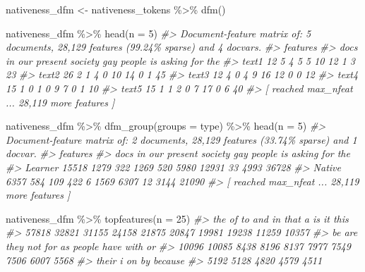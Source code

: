 \documentclass[
]{article}
\newenvironment{Shaded}{\begin{snugshade}}{\end{snugshade}}
\newcommand{\AttributeTok}[1]{\textcolor[rgb]{0.77,0.63,0.00}{#1}}
\newcommand{\CommentTok}[1]{\textcolor[rgb]{0.56,0.35,0.01}{\textit{#1}}}
\newcommand{\DecValTok}[1]{\textcolor[rgb]{0.00,0.00,0.81}{#1}}
\newcommand{\FunctionTok}[1]{\textcolor[rgb]{0.00,0.00,0.00}{#1}}
\newcommand{\NormalTok}[1]{#1}
\newcommand{\OtherTok}[1]{\textcolor[rgb]{0.56,0.35,0.01}{#1}}
\newcommand{\SpecialCharTok}[1]{\textcolor[rgb]{0.00,0.00,0.00}{#1}}
\begin{document}
\begin{Shaded}
\begin{Highlighting}[]
\NormalTok{nativeness\_dfm }\OtherTok{\textless{}{-}}\NormalTok{ nativeness\_tokens }\SpecialCharTok{\%\textgreater{}\%}
    \FunctionTok{dfm}\NormalTok{()}

\NormalTok{nativeness\_dfm }\SpecialCharTok{\%\textgreater{}\%}
    \FunctionTok{head}\NormalTok{(}\AttributeTok{n =} \DecValTok{5}\NormalTok{)}
\CommentTok{\#\textgreater{} Document{-}feature matrix of: 5 documents, 28,129 features (99.24\% sparse) and 4 docvars.}
\CommentTok{\#\textgreater{}        features}
\CommentTok{\#\textgreater{} docs    in our present society gay people is asking for the}
\CommentTok{\#\textgreater{}   text1 12   5       4       5   5     10 12      1   3  23}
\CommentTok{\#\textgreater{}   text2 26   2       1       4   0     10 14      0   1  45}
\CommentTok{\#\textgreater{}   text3 12   4       0       4   9     16 12      0   0  12}
\CommentTok{\#\textgreater{}   text4 15   1       0       1   0      9  7      0   1  10}
\CommentTok{\#\textgreater{}   text5 15   1       1       2   0      7 17      0   6  40}
\CommentTok{\#\textgreater{} [ reached max\_nfeat ... 28,119 more features ]}

\NormalTok{nativeness\_dfm }\SpecialCharTok{\%\textgreater{}\%}
    \FunctionTok{dfm\_group}\NormalTok{(}\AttributeTok{groups =}\NormalTok{ type) }\SpecialCharTok{\%\textgreater{}\%}
    \FunctionTok{head}\NormalTok{(}\AttributeTok{n =} \DecValTok{5}\NormalTok{)}
\CommentTok{\#\textgreater{} Document{-}feature matrix of: 2 documents, 28,129 features (33.74\% sparse) and 1 docvar.}
\CommentTok{\#\textgreater{}          features}
\CommentTok{\#\textgreater{} docs         in  our present society gay people    is asking  for   the}
\CommentTok{\#\textgreater{}   Learner 15518 1279     322    1269 520   5980 12931     33 4993 36728}
\CommentTok{\#\textgreater{}   Native   6357  584     109     422   6   1569  6307     12 3144 21090}
\CommentTok{\#\textgreater{} [ reached max\_nfeat ... 28,119 more features ]}
\end{Highlighting}
\end{Shaded}

\begin{Shaded}
\begin{Highlighting}[]
\NormalTok{nativeness\_dfm }\SpecialCharTok{\%\textgreater{}\%}
    \FunctionTok{topfeatures}\NormalTok{(}\AttributeTok{n =} \DecValTok{25}\NormalTok{)}
\CommentTok{\#\textgreater{}     the      of      to     and      in    that       a      is      it    this }
\CommentTok{\#\textgreater{}   57818   32821   31155   24158   21875   20847   19981   19238   11259   10357 }
\CommentTok{\#\textgreater{}      be     are    they     not     for      as  people    have    with      or }
\CommentTok{\#\textgreater{}   10096   10085    8438    8196    8137    7977    7549    7506    6007    5568 }
\CommentTok{\#\textgreater{}   their       i      on      by because }
\CommentTok{\#\textgreater{}    5192    5128    4820    4579    4511}
\end{Highlighting}
\end{Shaded}
\end{document}
